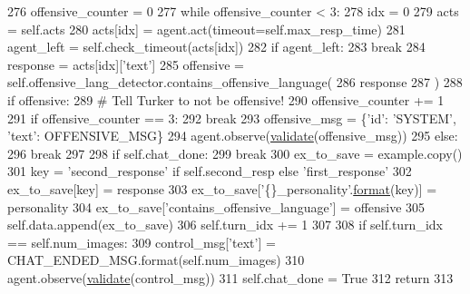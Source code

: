 \begin{DoxyCode}
276             offensive\_counter = 0
277             \textcolor{keywordflow}{while} offensive\_counter < 3:
278                 idx = 0
279                 acts = self.acts
280                 acts[idx] = agent.act(timeout=self.max\_resp\_time)
281                 agent\_left = self.check\_timeout(acts[idx])
282                 \textcolor{keywordflow}{if} agent\_left:
283                     \textcolor{keywordflow}{break}
284                 response = acts[idx][\textcolor{stringliteral}{'text'}]
285                 offensive = self.offensive\_lang\_detector.contains\_offensive\_language(
286                     response
287                 )
288                 \textcolor{keywordflow}{if} offensive:
289                     \textcolor{comment}{# Tell Turker to not be offensive!}
290                     offensive\_counter += 1
291                     \textcolor{keywordflow}{if} offensive\_counter == 3:
292                         \textcolor{keywordflow}{break}
293                     offensive\_msg = \{\textcolor{stringliteral}{'id'}: \textcolor{stringliteral}{'SYSTEM'}, \textcolor{stringliteral}{'text'}: OFFENSIVE\_MSG\}
294                     agent.observe(\hyperlink{namespaceparlai_1_1core_1_1worlds_afc3fad603b7bce41dbdc9cdc04a9c794}{validate}(offensive\_msg))
295                 \textcolor{keywordflow}{else}:
296                     \textcolor{keywordflow}{break}
297 
298             \textcolor{keywordflow}{if} self.chat\_done:
299                 \textcolor{keywordflow}{break}
300             ex\_to\_save = example.copy()
301             key = \textcolor{stringliteral}{'second\_response'} \textcolor{keywordflow}{if} self.second\_resp \textcolor{keywordflow}{else} \textcolor{stringliteral}{'first\_response'}
302             ex\_to\_save[key] = response
303             ex\_to\_save[\textcolor{stringliteral}{'\{\}\_personality'}.\hyperlink{namespaceparlai_1_1chat__service_1_1services_1_1messenger_1_1shared__utils_a32e2e2022b824fbaf80c747160b52a76}{format}(key)] = personality
304             ex\_to\_save[\textcolor{stringliteral}{'contains\_offensive\_language'}] = offensive
305             self.data.append(ex\_to\_save)
306             self.turn\_idx += 1
307 
308         \textcolor{keywordflow}{if} self.turn\_idx == self.num\_images:
309             control\_msg[\textcolor{stringliteral}{'text'}] = CHAT\_ENDED\_MSG.format(self.num\_images)
310             agent.observe(\hyperlink{namespaceparlai_1_1core_1_1worlds_afc3fad603b7bce41dbdc9cdc04a9c794}{validate}(control\_msg))
311         self.chat\_done = \textcolor{keyword}{True}
312         \textcolor{keywordflow}{return}
313 
\end{DoxyCode}
\mbox{\label{classimage__chat__collection_1_1worlds_1_1MTurkImageChatWorld_a02bb22cb19e1f1ccecab9043a18741e1}} 
